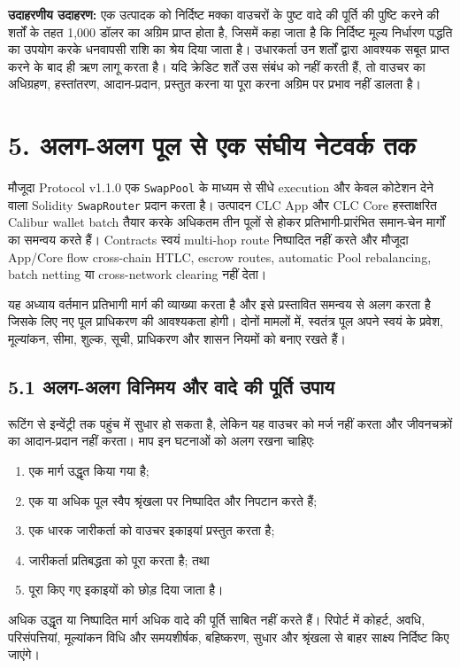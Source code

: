 \documentclass[11pt]{article}
\begin{document}
\textbf{उदाहरणीय उदाहरण:} एक उत्पादक को निर्दिष्ट मक्का वाउचरों के पुष्ट वादे की पूर्ति की पुष्टि करने की शर्तों के तहत 1,000 डॉलर का अग्रिम प्राप्त होता है, जिसमें कहा जाता है कि निर्दिष्ट मूल्य निर्धारण पद्धति का उपयोग करके धनवापसी राशि का श्रेय दिया जाता है। उधारकर्ता उन शर्तों द्वारा आवश्यक सबूत प्राप्त करने के बाद ही ऋण लागू करता है। यदि क्रेडिट शर्तें उस संबंध को नहीं करती हैं, तो वाउचर का अधिग्रहण, हस्तांतरण, आदान-प्रदान, प्रस्तुत करना या पूरा करना अग्रिम पर प्रभाव नहीं डालता है।


\section*{5. अलग-अलग पूल से एक संघीय नेटवर्क तक}

मौजूदा Protocol v1.1.0 एक \texttt{SwapPool} के माध्यम से सीधे execution और केवल कोटेशन देने वाला Solidity \texttt{SwapRouter} प्रदान करता है। उत्पादन CLC App और CLC Core हस्ताक्षरित Calibur wallet batch तैयार करके अधिकतम तीन पूलों से होकर प्रतिभागी-प्रारंभित समान-चेन मार्गों का समन्वय करते हैं। Contracts स्वयं multi-hop route निष्पादित नहीं करते और मौजूदा App/Core flow cross-chain HTLC, escrow routes, automatic Pool rebalancing, batch netting या cross-network clearing नहीं देता।

यह अध्याय वर्तमान प्रतिभागी मार्ग की व्याख्या करता है और इसे प्रस्तावित समन्वय से अलग करता है जिसके लिए नए पूल प्राधिकरण की आवश्यकता होगी। दोनों मामलों में, स्वतंत्र पूल अपने स्वयं के प्रवेश, मूल्यांकन, सीमा, शुल्क, सूची, प्राधिकरण और शासन नियमों को बनाए रखते हैं।

\subsection*{5.1 अलग-अलग विनिमय और वादे की पूर्ति उपाय}

रूटिंग से इन्वेंट्री तक पहुंच में सुधार हो सकता है, लेकिन यह वाउचर को मर्ज नहीं करता और जीवनचक्रों का आदान-प्रदान नहीं करता। माप इन घटनाओं को अलग रखना चाहिएः

\begin{enumerate}[leftmargin=*]
\item एक मार्ग उद्धृत किया गया है;
\item एक या अधिक पूल स्वैप श्रृंखला पर निष्पादित और निपटान करते हैं;
\item एक धारक जारीकर्ता को वाउचर इकाइयां प्रस्तुत करता है;
\item जारीकर्ता प्रतिबद्धता को पूरा करता है; तथा
\item पूरा किए गए इकाइयों को छोड़ दिया जाता है।
\end{enumerate}
अधिक उद्धृत या निष्पादित मार्ग अधिक वादे की पूर्ति साबित नहीं करते हैं। रिपोर्ट में कोहर्ट, अवधि, परिसंपत्तियां, मूल्यांकन विधि और समयशीर्षक, बहिष्करण, सुधार और श्रृंखला से बाहर साक्ष्य निर्दिष्ट किए जाएंगे।
\end{document}
